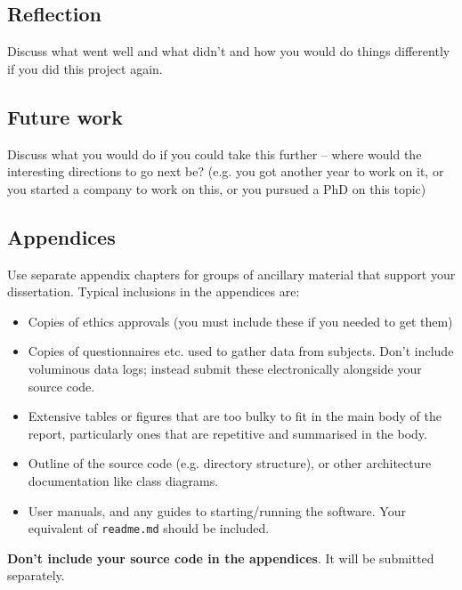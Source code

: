 \documentclass{l4proj}
\begin{document}
\section{Reflection}
Discuss what went well and what didn't and how you would do things differently if you did this project again.

\section{Future work}
Discuss what you would do if you could take this further -- where would the interesting directions to go next be? (e.g. you got another year to work on it, or you started a company to work on this, or you pursued a PhD on this topic)

%
% 

\begin{appendices}

\chapter{Appendices}

Use separate appendix chapters for groups of ancillary material that support your dissertation. 
Typical inclusions in the appendices are:

\begin{itemize}
\item
  Copies of ethics approvals (you must include these if you needed to get them)
\item
  Copies of questionnaires etc. used to gather data from subjects. Don't include
  voluminous data logs; instead submit these electronically alongside your source code.
\item
  Extensive tables or figures that are too bulky to fit in the main body of
  the report, particularly ones that are repetitive and summarised in the body.
\item Outline of the source code (e.g. directory structure), 
    or other architecture documentation like class diagrams.
\item User manuals, and any guides to starting/running the software. 
Your equivalent of \texttt{readme.md} should be included.

\end{itemize}

\textbf{Don't include your source code in the appendices}. It will be
submitted separately.



\end{appendices}
\end{document}
